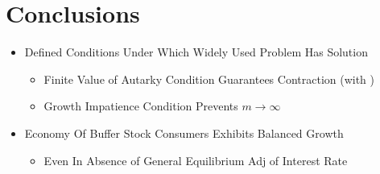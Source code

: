\documentclass[pdflatex]{beamer}\providecommand{\texname}{BufferStockTheory-Slides}%
\begin{document}
\section{Conclusions}
\begin{frame}

\begin{itemize}
\item Defined Conditions Under Which Widely Used Problem Has Solution
\begin{itemize}
\item Finite Value of Autarky Condition Guarantees Contraction (with \WRIC)
\item Growth Impatience Condition Prevents $m \rightarrow \infty$
\end{itemize}
\item Economy Of Buffer Stock Consumers Exhibits Balanced Growth
\begin{itemize}
\item Even In Absence of General Equilibrium Adj of Interest Rate
\end{itemize}
\end{itemize}

\end{frame}

\def\newblock{\hskip .11em plus .33em minus .07em}

\begin{frame}

\renewcommand{\bibsection}{\subsubsection*{\bibname }}

\tiny 

% 


\end{frame}
\end{document}

